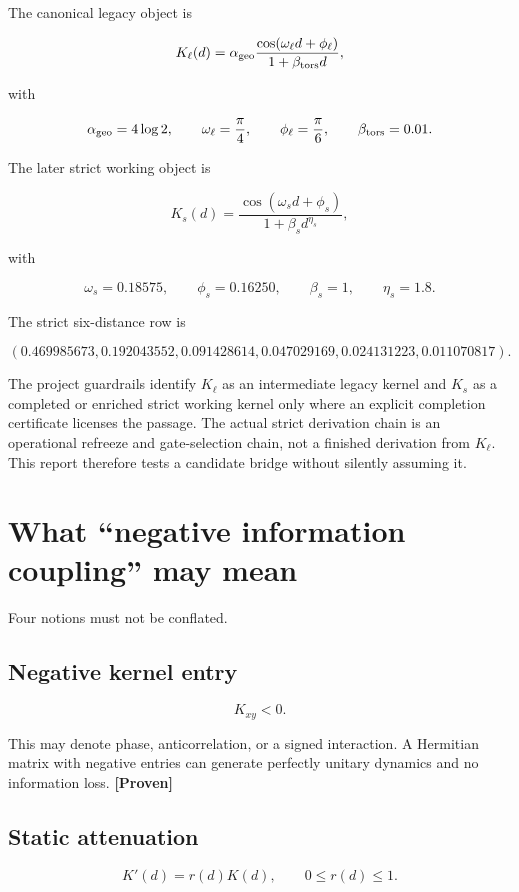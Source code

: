 \documentclass[11pt,a4paper,openany]{report}
\newcommand{\statusProven}{\textcolor{fingreen}{[Proven]}}
\begin{document}
The canonical legacy object is

\[
K_\ell(d)
=\alpha_{\rm geo}
\frac{\cos(\omega_\ell d+\phi_\ell)}{1+\beta_{\rm tors}d},
\]

with

\[
\alpha_{\rm geo}=4\log2,
\qquad
\omega_\ell=\frac\pi4,
\qquad
\phi_\ell=\frac\pi6,
\qquad
\beta_{\rm tors}=0.01.
\]

The later strict working object is

\[
K_s(d)
=\frac{\cos(\omega_s d+\phi_s)}{1+\beta_s d^{\eta_s}},
\]

with

\[
\omega_s=0.18575,
\qquad
\phi_s=0.16250,
\qquad
\beta_s=1,
\qquad
\eta_s=1.8.
\]

The strict six-distance row is

\[
(0.469985673,
0.192043552,
0.091428614,
0.047029169,
0.024131223,
0.011070817).
\]

The project guardrails identify \(K_\ell\) as an intermediate legacy kernel and \(K_s\) as a completed or enriched strict working kernel only where an explicit completion certificate licenses the passage. The actual strict derivation chain is an operational refreeze and gate-selection chain, not a finished derivation from \(K_\ell\). This report therefore tests a candidate bridge without silently assuming it.

\section{What “negative information coupling” may mean}

Four notions must not be conflated.

\subsection{Negative kernel entry}

\[
K_{xy}<0.
\]

This may denote phase, anticorrelation, or a signed interaction. A Hermitian matrix with negative entries can generate perfectly unitary dynamics and no information loss. \textbf{\statusProven{}}

\subsection{Static attenuation}

\[
K'(d)=r(d)K(d),
\qquad 0\le r(d)\le1.
\]
\end{document}
